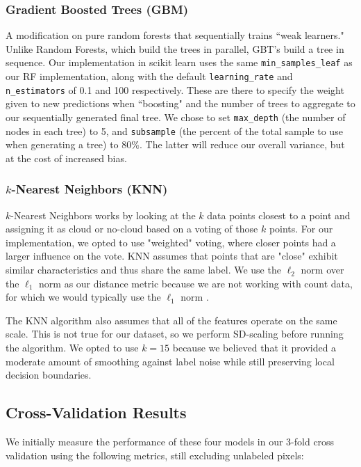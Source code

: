 \documentclass[11pt,letterpaper]{article}
\begin{document}
\subsubsection{Gradient Boosted Trees (GBM)}

A modification on pure random forests that sequentially trains ``weak learners." Unlike Random Forests, which build the trees in parallel, GBT's build a tree in sequence. Our implementation in scikit learn uses the same \texttt{min\_samples\_leaf} as our RF implementation, along with the default \texttt{learning\_rate} and \texttt{n\_estimators} of 0.1 and 100 respectively. These are there to specify the weight given to new predictions when ``boosting" and the number of trees to aggregate to our sequentially generated final tree. We chose to set \texttt{max\_depth} (the number of nodes in each tree) to 5, and \texttt{subsample} (the percent of the total sample to use when generating a tree) to $80\%$. The latter will reduce our overall variance, but at the cost of increased bias.

\subsubsection{$k$-Nearest Neighbors (KNN)}

$k$-Nearest Neighbors works by looking at the $k$ data points closest to a point and assigning it as cloud or no-cloud based on a voting of those $k$ points. For our implementation, we opted to use "weighted" voting, where closer points had a larger influence on the vote. KNN assumes that points that are "close" exhibit similar characteristics and thus share the same label. We use the $\ell_2$ norm over the $\ell_1$ norm as our distance metric because we are not working with count data, for which we would typically use the $\ell_1$ norm \cite{Yu}.

The KNN algorithm also assumes that all of the features operate on the same scale. This is not true for our dataset, so we perform SD-scaling before running the algorithm. We opted to use $k=15$ because we believed that it provided a moderate amount of smoothing against label noise while still preserving local decision boundaries.

\subsection{Cross-Validation Results}

We initially measure the performance of these four models in our 3-fold cross validation using the following metrics, still excluding unlabeled pixels:
\vspace{10pt}
\end{document}
